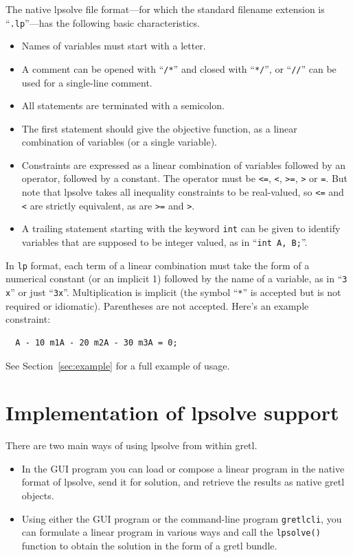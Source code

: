 \documentclass{article}
\begin{document}
The native \textsf{lpsolve} file format---for which the standard
filename extension is ``\texttt{.lp}''---has the following
basic characteristics.
\begin{itemize}
\item Names of variables must start with a letter.
\item A comment can be opened with ``\texttt{/*}'' and closed with
  ``\texttt{*/}'', or ``\texttt{//}'' can be used for a single-line
  comment.
\item All statements are terminated with a semicolon.
\item The first statement should give the objective function, as a
  linear combination of variables (or a single variable).
\item Constraints are expressed as a linear combination of variables
  followed by an operator, followed by a constant.  The operator must
  be \texttt{<=}, \texttt{<}, \texttt{>=}, \texttt{>} or \texttt{=}.
  But note that \textsf{lpsolve} takes all inequality constraints to
  be real-valued, so \texttt{<=} and \texttt{<} are strictly
  equivalent, as are \texttt{>=} and \texttt{>}.
\item A trailing statement starting with the keyword \texttt{int} can
  be given to identify variables that are supposed to be integer
  valued, as in ``\texttt{int A, B;}''.
\end{itemize}

In \texttt{lp} format, each term of a linear combination must take the
form of a numerical constant (or an implicit 1) followed by the name
of a variable, as in ``\texttt{3 x}'' or just
``\texttt{3x}''. Multiplication is implicit (the symbol ``\texttt{*}''
is accepted but is not required or idiomatic). Parentheses are not
accepted. Here's an example constraint:
\begin{verbatim}
  A - 10 m1A - 20 m2A - 30 m3A = 0;
\end{verbatim}
See Section~\ref{sec:example} for a full example of usage.

\section{Implementation of lpsolve support}
\label{sec:implement}

There are two main ways of using \textsf{lpsolve} from within gretl.
\begin{itemize}
\item In the GUI program you can load or compose a linear program in
  the native format of \textsf{lpsolve}, send it for solution, and
  retrieve the results as native gretl objects.
\item Using either the GUI program or the command-line program
  \texttt{gretlcli}, you can formulate a linear program in various
  ways and call the \texttt{lpsolve()} function to obtain the solution
  in the form of a gretl bundle.
\end{itemize}
\end{document}

